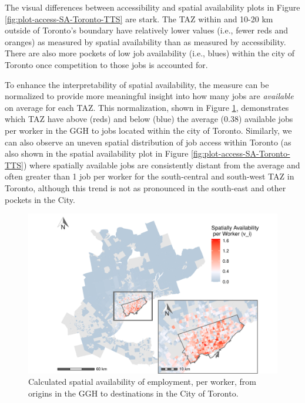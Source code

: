 \documentclass[]{elsarticle} %
\begin{document}
\newpage

The visual differences between accessibility and spatial availability
plots in Figure \ref{fig:plot-access-SA-Toronto-TTS} are stark. The TAZ
within and 10-20 km outside of Toronto's boundary have relatively lower
values (i.e., fewer reds and oranges) as measured by spatial
availability than as measured by accessibility. There are also more
pockets of low job availability (i.e., blues) within the city of Toronto
once competition to those jobs is accounted for.

To enhance the interpretability of spatial availability, the measure can
be normalized to provide more meaningful insight into how many jobs are
\emph{available} on average for each TAZ. This normalization, shown in
Figure \ref{fig:plot-avail-Toronto-TTS-per-worker}, demonstrates which
TAZ have above (reds) and below (blue) the average (0.38) available jobs
per worker in the GGH to jobs located within the city of Toronto.
Similarly, we can also observe an uneven spatial distribution of job
access within Toronto (as also shown in the spatial availability plot in
Figure \ref{fig:plot-access-SA-Toronto-TTS}) where spatially available
jobs are consistently distant from the average and often greater than 1
job per worker for the south-central and south-west TAZ in Toronto,
although this trend is not as pronounced in the south-east and other
pockets in the City.

\begin{figure}
\includegraphics[width=1\linewidth]{Spatial-Availability_files/figure-latex/plot-avail-Toronto-TTS-per-worker-1} \caption{\label{fig:plot-avail-Toronto-TTS-per-worker}Calculated spatial availability of employment, per worker, from origins in the GGH to destinations in the City of Toronto.}\label{fig:plot-avail-Toronto-TTS-per-worker}
\end{figure}
\end{document}
